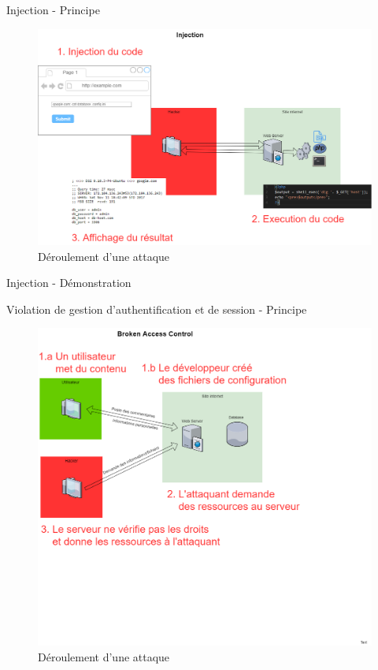 \documentclass{beamer}
\begin{document}
			\begin{frame}{Injection - Principe}
					\begin{figure}
						\centering
						\includegraphics[width=0.9\linewidth]{schemas/images/injection.png}
						\caption{Déroulement d'une attaque}
					\end{figure}
			\end{frame}
		
			\begin{frame}{Injection - Démonstration}
			
			\end{frame}
	
			\begin{frame}{Violation de gestion d'authentification et de session - Principe}
			\begin{figure}
					\centering
					\includegraphics[width=0.9\linewidth]{schemas/images/broken_ac.png}
					\caption{Déroulement d'une attaque}
				\end{figure}
			\end{frame}
			
\end{document}
